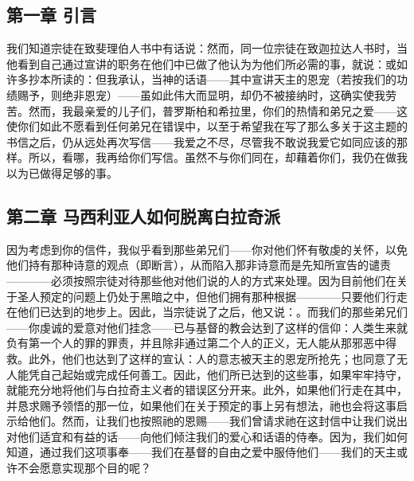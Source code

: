 
\subsection{第一章 引言}

我们知道宗徒在致斐理伯人书中有话说：然而，同一位宗徒在致迦拉达人书时，当他看到自己通过宣讲的职务在他们中已做了他认为为他们所必需的事，就说：或如许多抄本所读的：但我承认，当神的话语——其中宣讲天主的恩宠（若按我们的功绩赐予，则绝非恩宠）——虽如此伟大而显明，却仍不被接纳时，这确实使我劳苦。然而，我最亲爱的儿子们，普罗斯柏和希拉里，你们的热情和弟兄之爱——这使你们如此不愿看到任何弟兄在错误中，以至于希望我在写了那么多关于这主题的书信之后，仍从远处再次写信——我爱之不尽，尽管我不敢说我爱它如同应该的那样。所以，看哪，我再给你们写信。虽然不与你们同在，却藉着你们，我仍在做我以为已做得足够的事。\par


\subsection{第二章 马西利亚人如何脱离白拉奇派}

因为考虑到你的信件，我似乎看到那些弟兄们——你对他们怀有敬虔的关怀，以免他们持有那种诗意的观点（即断言），从而陷入那非诗意而是先知所宣告的谴责————必须按照宗徒对待那些他对他们说的人的方式来处理。因为目前他们在关于圣人预定的问题上仍处于黑暗之中，但他们拥有那种根据————只要他们行走在他们已达到的地步上。因此，当宗徒说了之后，他又说：。而我们的那些弟兄们——你虔诚的爱意对他们挂念——已与基督的教会达到了这样的信仰：人类生来就负有第一个人的罪的罪责，并且除非通过第二个人的正义，无人能从那邪恶中得救。此外，他们也达到了这样的宣认：人的意志被天主的恩宠所抢先；也同意了无人能凭自己起始或完成任何善工。因此，他们所已达到的这些事，如果牢牢持守，就能充分地将他们与白拉奇主义者的错误区分开来。此外，如果他们行走在其中，并恳求赐予领悟的那一位，如果他们在关于预定的事上另有想法，祂也会将这事启示给他们。然而，让我们也按照祂的恩赐——我们曾请求祂在这封信中让我们说出对他们适宜和有益的话——向他们倾注我们的爱心和话语的侍奉。因为，我们如何知道，通过我们这项事奉——我们在基督的自由之爱中服侍他们——我们的天主或许不会愿意实现那个目的呢？\par

